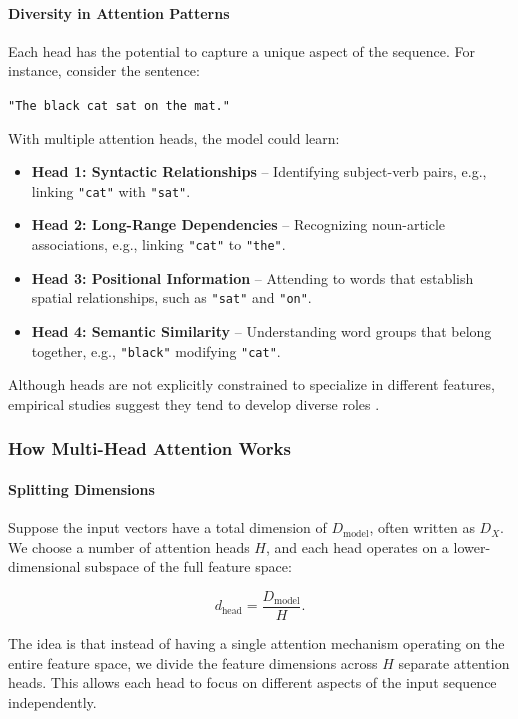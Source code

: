 \paragraph{Diversity in Attention Patterns} 
Each head has the potential to capture a unique aspect of the sequence. For instance, consider the sentence:

\begin{center}
    \texttt{"The black cat sat on the mat."}
\end{center}

With multiple attention heads, the model could learn:
\begin{itemize}
    \item \textbf{Head 1: Syntactic Relationships} – Identifying subject-verb pairs, e.g., linking \texttt{"cat"} with \texttt{"sat"}.
    \item \textbf{Head 2: Long-Range Dependencies} – Recognizing noun-article associations, e.g., linking \texttt{"cat"} to \texttt{"the"}.
    \item \textbf{Head 3: Positional Information} – Attending to words that establish spatial relationships, such as \texttt{"sat"} and \texttt{"on"}.
    \item \textbf{Head 4: Semantic Similarity} – Understanding word groups that belong together, e.g., \texttt{"black"} modifying \texttt{"cat"}.
\end{itemize}

\noindent Although heads are not explicitly constrained to specialize in different features, empirical studies suggest they tend to develop diverse roles \cite{voita2019_analyzing_heads}.

\subsubsection{How Multi-Head Attention Works}

\paragraph{Splitting Dimensions} 
\noindent Suppose the input vectors have a total dimension of \( D_{\text{model}} \), often written as \( D_X \). We choose a number of attention heads \( H \), and each head operates on a lower-dimensional subspace of the full feature space:

\[
d_{\text{head}} = \frac{D_{\text{model}}}{H}.
\]

\noindent The idea is that instead of having a single attention mechanism operating on the entire feature space, we divide the feature dimensions across \( H \) separate attention heads. This allows each head to focus on different aspects of the input sequence independently.

